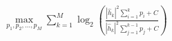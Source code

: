 \documentclass[preview]{standalone}
\begin{document}
\begin{align*}
\max_{p_1, p_2,...,p_M} \sum_{k=1}^{M} \log_2 \left(\frac{\left|{\hat{h}_k}\right|^2\sum_{i=1}^{k}p_i+ C}{\left|{\hat{h}_k}\right|^2\sum_{j=1}^{k-1}p_j+ C}\right)
\end{align*}
\end{document}
